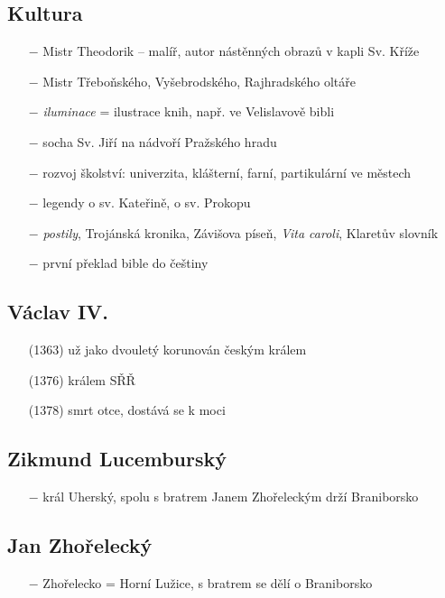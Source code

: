\documentclass{article}
\begin{document}
\subsection*{Kultura}
\begin{itemize}
    \vspace{-0.5em}
    \setlength\itemsep{0.15em}
    \item[$-$] Mistr Theodorik -- malíř, autor nástěnných obrazů v kapli Sv. Kříže
    \item[$-$] Mistr Třeboňského, Vyšebrodského, Rajhradského oltáře
    \item[$-$] \textit{iluminace} = ilustrace knih, např. ve Velislavově bibli
    \item[$-$] socha Sv. Jiří na nádvoří Pražského hradu
    \item[$-$] rozvoj školství: univerzita, klášterní, farní, partikulární ve městech
    \item[$-$] legendy o sv. Kateřině, o sv. Prokopu
    \item[$-$] \textit{postily}, Trojánská kronika, Závišova píseň, \textit{Vita caroli}, Klaretův slovník
    \item[$-$] první překlad bible do češtiny
\end{itemize}

\subsection*{Václav IV.}
\begin{itemize}
    \vspace{-0.5em}
    \setlength\itemsep{0.15em}
    \item[(1363)] už jako dvouletý korunován českým králem
    \item[(1376)] králem SŘŘ
    \item[(1378)] smrt otce, dostává se k moci
\end{itemize}


\subsection*{Zikmund Lucemburský}
\begin{itemize}
    \vspace{-0.5em}
    \setlength\itemsep{0.15em}
    \item[$-$] král Uherský, spolu s bratrem Janem Zhořeleckým drží Braniborsko
\end{itemize}

\subsection*{Jan Zhořelecký}
\begin{itemize}
    \vspace{-0.5em}
    \setlength\itemsep{0.15em}
    \item[$-$] Zhořelecko = Horní Lužice, s bratrem se dělí o Braniborsko
\end{itemize}
\end{document}
